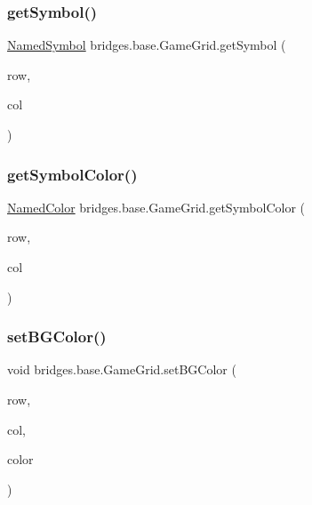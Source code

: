 \subsubsection{\texorpdfstring{get\+Symbol()}{getSymbol()}}
{\footnotesize\ttfamily \mbox{\hyperlink{enumbridges_1_1base_1_1_named_symbol}{Named\+Symbol}} bridges.\+base.\+Game\+Grid.\+get\+Symbol (\begin{DoxyParamCaption}\item[{Integer}]{row,  }\item[{Integer}]{col }\end{DoxyParamCaption})}

\mbox{\label{classbridges_1_1base_1_1_game_grid_ab094ebfd585aac9440836ad6875ce094}} 
\subsubsection{\texorpdfstring{get\+Symbol\+Color()}{getSymbolColor()}}
{\footnotesize\ttfamily \mbox{\hyperlink{enumbridges_1_1base_1_1_named_color}{Named\+Color}} bridges.\+base.\+Game\+Grid.\+get\+Symbol\+Color (\begin{DoxyParamCaption}\item[{Integer}]{row,  }\item[{Integer}]{col }\end{DoxyParamCaption})}

\mbox{\label{classbridges_1_1base_1_1_game_grid_a72d7d5b03b78fdc4110cee955727a523}} 
\subsubsection{\texorpdfstring{set\+B\+G\+Color()}{setBGColor()}\hspace{0.1cm}{\footnotesize\ttfamily [1/2]}}
{\footnotesize\ttfamily void bridges.\+base.\+Game\+Grid.\+set\+B\+G\+Color (\begin{DoxyParamCaption}\item[{Integer}]{row,  }\item[{Integer}]{col,  }\item[{\mbox{\hyperlink{enumbridges_1_1base_1_1_named_color}{Named\+Color}}}]{color }\end{DoxyParamCaption})}

